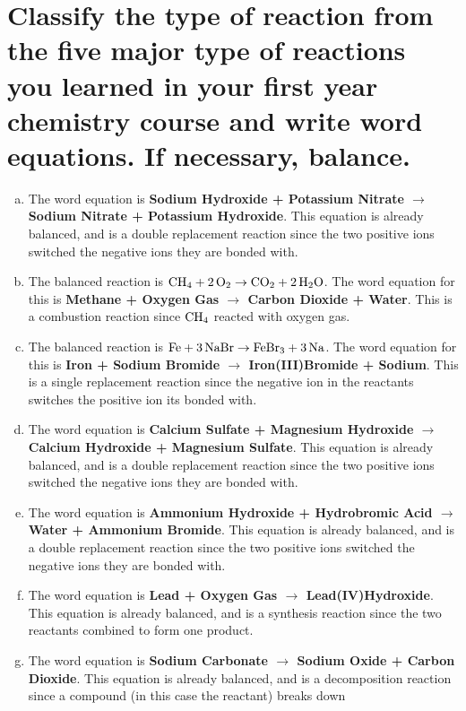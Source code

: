 \documentclass{scrartcl}
\begin{document}
\section{Classify the type of reaction from the five major type of reactions you learned in your first year chemistry course and write word equations. If necessary, balance.}
\label{sec:org069f7ad}
\begin{enumerate}[a.]
\item The word equation is \textbf{Sodium Hydroxide + Potassium Nitrate \(\rightarrow\) Sodium
Nitrate + Potassium Hydroxide}. This equation is already balanced, and is a
double replacement reaction since the two positive ions switched the negative
ions they are bonded with.
\item The balanced reaction is \(\ce{CH4 + 2O2}\rightarrow\ce{CO2 + 2H2O}\). The word
equation for this is \textbf{Methane + Oxygen Gas \(\rightarrow\) Carbon Dioxide + Water}.
This is a combustion reaction since \(\ce{CH4}\) reacted with oxygen gas.
\item The balanced reaction is \(\ce{Fe + 3NaBr}\rightarrow\ce{FeBr3 + 3Na}\). The word
equation for this is \textbf{Iron + Sodium Bromide \(\rightarrow\) Iron(III)Bromide +
Sodium}. This is a single replacement reaction since the negative ion in the
reactants switches the positive ion its bonded with.
\item The word equation is \textbf{Calcium Sulfate + Magnesium Hydroxide \(\rightarrow\)
Calcium Hydroxide + Magnesium Sulfate}. This equation is already balanced, and
is a double replacement reaction since the two positive ions switched the
negative ions they are bonded with.
\item The word equation is \textbf{Ammonium Hydroxide + Hydrobromic Acid \(\rightarrow\)
Water + Ammonium Bromide}. This equation is already balanced, and is a double
replacement reaction since the two positive ions switched the negative ions
they are bonded with.
\item The word equation is \textbf{Lead + Oxygen Gas \(\rightarrow\) Lead(IV)Hydroxide}. This
equation is already balanced, and is a synthesis reaction since the two
reactants combined to form one product.
\item The word equation is \textbf{Sodium Carbonate \(\rightarrow\) Sodium Oxide + Carbon
Dioxide}. This equation is already balanced, and is a decomposition reaction
since a compound (in this case the reactant) breaks down
\end{enumerate}
\end{document}
